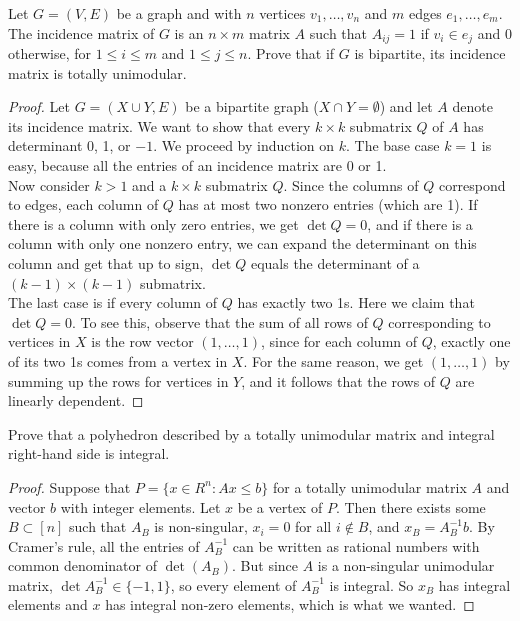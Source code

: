 \documentclass[12pt]{article}
\newenvironment{problem}[2][Problem]{\begin{trivlist}
\item[\hskip \labelsep {\bfseries #1}\hskip \labelsep {\bfseries #2.}]}{\end{trivlist}}
\theoremstyle{plain}
\begin{document}
\begin{problem}{7}
    Let $G=(V,E)$ be a graph and with $n$ vertices $v_1,\ldots,v_n$ and $m$ edges $e_1,\ldots,e_m$. The incidence matrix of $G$ is an $n\times m$ matrix $A$ such that $A_{ij} = 1$ if $v_i\in e_j$ and 0 otherwise, for $1\leq i\leq m$ and $1\leq j\leq n$. Prove that if $G$ is bipartite, its incidence matrix is totally unimodular.
\end{problem}
\begin{proof}
    Let $G=(X\cup Y, E)$ be a bipartite graph ($X\cap Y = \emptyset$) and let $A$ denote its incidence matrix. We want to show that every $k\times k$ submatrix $Q$ of $A$ has determinant 0, 1, or $-1$. We proceed by induction on $k$. The base case $k=1$ is easy, because all the entries of an incidence matrix are 0 or 1.\\
    \indent Now consider $k>1$ and a $k\times k$ submatrix $Q$. Since the columns of $Q$ correspond to edges, each column of $Q$ has at most two nonzero entries (which are 1). If there is a column with only zero entries, we get $\det Q = 0$, and if there is a column with only one nonzero entry, we can expand the determinant on this column and get that up to sign, $\det Q$ equals the determinant of a $(k-1)\times(k-1)$ submatrix.\\
    \indent The last case is if every column of $Q$ has exactly two 1s. Here we claim that $\det Q = 0$. To see this, observe that the sum of all rows of $Q$ corresponding to vertices in $X$ is the row vector $(1,\ldots,1)$, since for each column of $Q$, exactly one of its two 1s comes from a vertex in $X$. For the same reason, we get $(1,\ldots,1)$ by summing up the rows for vertices in $Y$, and it follows that the rows of $Q$ are linearly dependent.
\end{proof}

\begin{problem}{8}
    Prove that a polyhedron described by a totally unimodular matrix and integral right-hand side is integral.
\end{problem}
\begin{proof}
    Suppose that $P = \{x\in R^n : Ax\leq b\}$ for a totally unimodular matrix $A$ and vector $b$ with integer elements. Let $x$ be a vertex of $P$. Then there exists some $B\subset [n]$ such that $A_B$ is non-singular, $x_i = 0$ for all $i\notin B$, and $x_B = A_B^{-1}b$. By Cramer's rule, all the entries of $A_B^{-1}$ can be written as rational numbers with common denominator of $\det(A_B)$. But since $A$ is a non-singular unimodular matrix, $\det A_B^{-1} \in\{-1,1\}$, so every element of $A_B^{-1}$ is integral. So $x_B$ has integral elements and $x$ has integral non-zero elements, which is what we wanted.
\end{proof}
\end{document}
